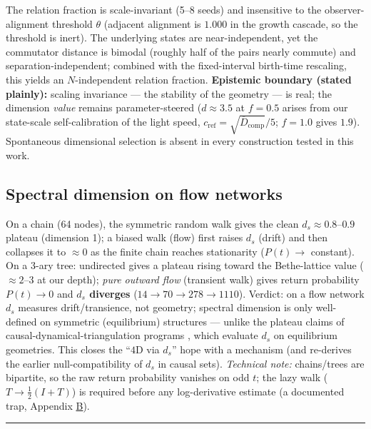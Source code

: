 \documentclass[12pt,a4paper]{article}
\begin{document}
The relation fraction is scale-invariant (5--8 seeds) and insensitive to
the observer-alignment threshold \(\theta\) (adjacent alignment is
\(1.000\) in the growth cascade, so the threshold is inert). The
underlying states are near-independent, yet the commutator distance is
bimodal (roughly half of the pairs nearly commute) and
separation-independent; combined with the fixed-interval birth-time
rescaling, this yields an \(N\)-independent relation fraction.
\textbf{Epistemic boundary (stated plainly):} scaling invariance --- the
stability of the geometry --- is real; the dimension \emph{value}
remains parameter-steered (\(d\approx3.5\) at \(f=0.5\) arises from our
state-scale self-calibration of the light speed,
\(c_{\mathrm{ref}}=\sqrt{\overline{D}_{\mathrm{comp}}}/5\); \(f=1.0\)
gives \(1.9\)). Spontaneous dimensional selection is absent in every
construction tested in this work.

\subsection{Spectral dimension on flow
networks}\label{spectral-dimension-on-flow-networks}

On a chain (64 nodes), the symmetric random walk gives the clean
\(d_s\approx0.8\)--\(0.9\) plateau (dimension 1); a biased walk (flow)
first raises \(d_s\) (drift) and then collapses it to \(\approx0\) as
the finite chain reaches stationarity (\(P(t)\to\) constant). On a 3-ary
tree: undirected gives a plateau rising toward the Bethe-lattice value
(\(\approx2\)--\(3\) at our depth); \emph{pure outward flow} (transient
walk) gives return probability \(P(t)\to0\) and \textbf{\(d_s\)
diverges} (\(14\to70\to278\to1110\)). Verdict: on a flow network \(d_s\)
measures drift/transience, not geometry; spectral dimension is only
well-defined on symmetric (equilibrium) structures --- unlike the
plateau claims of causal-dynamical-triangulation programs
\cite{ambjorn_jurkiewicz_loll_2005}, which evaluate \(d_s\) on equilibrium
geometries. This closes the ``\(4\)D via \(d_s\)'' hope with a mechanism
(and re-derives the earlier null-compatibility of \(d_s\) in causal
sets). \emph{Technical note:} chains/trees are bipartite, so the raw
return probability vanishes on odd \(t\); the lazy walk
(\(T\to\frac12(I+T)\)) is required before any log-derivative estimate (a
documented trap, Appendix \hyperref[appendix-b-trap-catalog]{B}).

\begin{center}\rule{0.5\linewidth}{0.5pt}\end{center}
\end{document}
